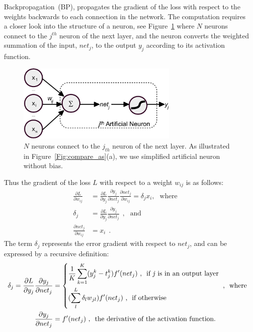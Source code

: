 Backpropagation~(BP), propagates the gradient of the loss with respect to the weights backwards to each connection in the network.
The computation requires a closer look into the structure of a neuron, see Figure~\ref{Fig:neuron_net} where $N$ neurons connect to the $j^{th}$ neuron of the next layer, and the neuron converts the weighted summation of the input, $net_j$, to the output $y_j$ according to its activation function.
\begin{figure}[bt]
	\centering
	\includegraphics[width=0.7\textwidth]{pics_iconip/neuron.pdf}
	\caption{ $N$ neurons connect to the $j_{th}$ neuron of the next layer. As illustrated in Figure~\ref{Fig:compare_as}(a), we use simplified artificial neuron without bias.}
	\label{Fig:neuron_net}
\end{figure}
Thus the gradient of the loss $L$ with respect to a weight $w_{ij}$ is as follows:
\begin{equation}
\begin{aligned}
\frac{\partial L}{\partial w_{ij}} &= \frac{\partial L}{\partial y_j} \frac{\partial y_j}{\partial net_j} \frac{\partial net_j}{\partial w_{ij}} = \delta_j x_i , \textrm{~~where~~}\\
 \delta_j &=  \frac{\partial L}{\partial y_j} \frac{\partial y_j}{\partial net_j}~~,  \textrm{~~and~~}\\
 \frac{\partial net_j}{\partial w_{ij}} &= x_i~~.
\end{aligned}
\end{equation}
The term $ \delta_j $ represents the error gradient with respect to $net_j$, and can be expressed by a recursive definition:
\begin{equation}
\begin{aligned}
\delta_j =  \frac{\partial L}{\partial y_j} \frac{\partial y_j}{\partial net_j} &= \left\{
\begin{aligned}
&\frac{1}{K}\sum_{k=1}^K (y^{k}_{j}-t^{k}_{j}) f'(net_j)  \textrm{~,~~if \textit{j} is in an output layer} \\
&(\sum_l^L \delta_l w_{jl}) f'(net_j)  \textrm{~,~~if otherwise}
\end{aligned}
\right. \textrm{~,~~where}\\
 \frac{\partial y_j}{\partial net_j} &=  f'(net_j) \textrm{~,~~the derivative of the activation function}.
\end{aligned}
\label{equ:derivative}
\end{equation}
